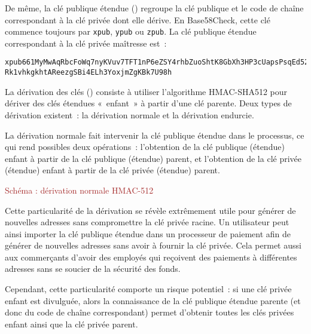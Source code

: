De même, la clé publique étendue () regroupe la clé publique et le code de chaîne correspondant à la clé privée dont elle dérive. En Base58Check, cette clé commence toujours par \verb?xpub?, \verb?ypub? ou \verb?zpub?. La clé publique étendue correspondant à la clé privée maîtresse est~:  

\begin{Verbatim}[fontsize=\footnotesize]
xpub661MyMwAqRbcFoWq7nyKVuv7TFT1nP6eZSY4rhbZuoShtK8GbXh3HP3cUapsPsqEd52T
Rk1vhkgkhtAReezgSBi4ELh3YoxjmZgKBk7U98h
\end{Verbatim}


La dérivation des clés () consiste à utiliser l'algorithme HMAC-SHA512 pour dériver des clés étendues «~enfant~» à partir d'une clé parente. Deux types de dérivation existent~: la dérivation normale et la dérivation endurcie.

La dérivation normale fait intervenir la clé publique étendue dans le processus, ce qui rend possibles deux opérations~: l'obtention de la clé publique (étendue) enfant à partir de la clé publique (étendue) parent, et l'obtention de la clé privée (étendue) enfant à partir de la clé privée (étendue) parent. 

\textcolor{brown}{Schéma : dérivation normale HMAC-512}

Cette particularité de la dérivation se révèle extrêmement utile pour générer de nouvelles adresses sans compromettre la clé privée racine. Un utilisateur peut ainsi importer la clé publique étendue dans un processeur de paiement afin de générer de nouvelles adresses sans avoir à fournir la clé privée. Cela permet aussi aux commerçants d'avoir des employés qui reçoivent des paiements à différentes adresses sans se soucier de la sécurité des fonds.

Cependant, cette particularité comporte un risque potentiel~: si une clé privée enfant est divulguée, alors la connaissance de la clé publique étendue parente (et donc du code de chaîne correspondant) permet d'obtenir toutes les clés privées enfant ainsi que la clé privée parent.


